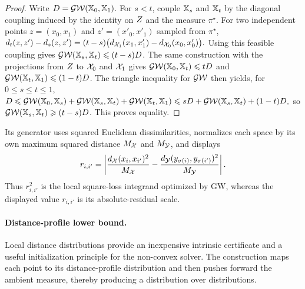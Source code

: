\begin{proof}
Write $D=\operatorname{\mathcal{GW}}(\mathbb{X}_0,\mathbb{X}_1)$. For $s<t$, couple $\mathbb{X}_s$ and $\mathbb{X}_t$ by the diagonal coupling induced by the identity on $Z$ and the measure $\pi^\star$. For two independent points $z=(x_0,x_1)$ and $z'=(x'_0,x'_1)$ sampled from $\pi^\star$,
\(d_t(z,z')-d_s(z,z') = (t-s)\big(d_{\mathcal{X}_1}(x_1,x'_1)-d_{\mathcal{X}_0}(x_0,x'_0)\big).\)
Using this feasible coupling gives $\operatorname{\mathcal{GW}}(\mathbb{X}_s,\mathbb{X}_t)\leqslant(t-s)D$. The same construction with the projections from $Z$ to $\mathcal{X}_0$ and $\mathcal{X}_1$ gives $\operatorname{\mathcal{GW}}(\mathbb{X}_0,\mathbb{X}_t)\leqslant tD$ and $\operatorname{\mathcal{GW}}(\mathbb{X}_t,\mathbb{X}_1)\leqslant(1-t)D$. The triangle inequality for $\operatorname{\mathcal{GW}}$ then yields, for $0\leq s\leq t\leq1$,
\(D \leqslant \operatorname{\mathcal{GW}}(\mathbb{X}_0,\mathbb{X}_s)+\operatorname{\mathcal{GW}}(\mathbb{X}_s,\mathbb{X}_t)+\operatorname{\mathcal{GW}}(\mathbb{X}_t,\mathbb{X}_1) \leqslant sD+\operatorname{\mathcal{GW}}(\mathbb{X}_s,\mathbb{X}_t)+(1-t)D,\)
so $\operatorname{\mathcal{GW}}(\mathbb{X}_s,\mathbb{X}_t)\geqslant(t-s)D$. This proves equality.
\end{proof}
Its generator uses squared Euclidean dissimilarities, normalizes each space by its own maximum squared distance $M_{\mathcal{X}}$ and $M_{\mathcal{Y}}$, and displays
\[
r_{i,i'}
=
\left|
\frac{d_{\mathcal{X}}(x_i,x_{i'})^2}{M_{\mathcal{X}}}
-
\frac{d_{\mathcal{Y}}(y_{\sigma(i)},y_{\sigma(i')})^2}{M_{\mathcal{Y}}}
\right|.
\]
Thus $r_{i,i'}^2$ is the local square-loss integrand optimized by GW, whereas the displayed value $r_{i,i'}$ is its absolute-residual scale.

\paragraph{Distance-profile lower bound.}
Local distance distributions provide an inexpensive intrinsic certificate and a useful initialization principle for the non-convex solver. The construction maps each point to its distance-profile distribution and then pushes forward the ambient measure, thereby producing a distribution over distributions.

